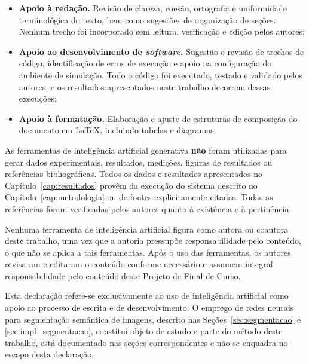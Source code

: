 \documentclass[
    12pt,
    openright,
    oneside,
    a4paper,
    english,
    brazil
]{abntex2}
\begin{document}
\begin{itemize}
    \item \textbf{Apoio à redação.} Revisão de clareza, coesão, ortografia e uniformidade terminológica do texto, bem como sugestões de organização de seções. Nenhum trecho foi incorporado sem leitura, verificação e edição pelos autores;
    \item \textbf{Apoio ao desenvolvimento de \textit{software}.} Sugestão e revisão de trechos de código, identificação de erros de execução e apoio na configuração do ambiente de simulação. Todo o código foi executado, testado e validado pelos autores, e os resultados apresentados neste trabalho decorrem dessas execuções;
    \item \textbf{Apoio à formatação.} Elaboração e ajuste de estruturas de composição do documento em \LaTeX, incluindo tabelas e diagramas.
\end{itemize}

As ferramentas de inteligência artificial generativa \textbf{não} foram utilizadas para gerar dados experimentais, resultados, medições, figuras de resultados ou referências bibliográficas. Todos os dados e resultados apresentados no Capítulo~\ref{cap:resultados} provêm da execução do sistema descrito no Capítulo~\ref{cap:metodologia} ou de fontes explicitamente citadas. Todas as referências foram verificadas pelos autores quanto à existência e à pertinência.

Nenhuma ferramenta de inteligência artificial figura como autora ou coautora deste trabalho, uma vez que a autoria pressupõe responsabilidade pelo conteúdo, o que não se aplica a tais ferramentas. Após o uso das ferramentas, os autores revisaram e editaram o conteúdo conforme necessário e assumem integral responsabilidade pelo conteúdo deste Projeto de Final de Curso.

Esta declaração refere-se exclusivamente ao uso de inteligência artificial como apoio ao processo de escrita e de desenvolvimento. O emprego de redes neurais para segmentação semântica de imagens, descrito nas Seções~\ref{sec:segmentacao} e \ref{sec:impl_segmentacao}, constitui objeto de estudo e parte do método deste trabalho, está documentado nas seções correspondentes e não se enquadra no escopo desta declaração.


\end{document}
